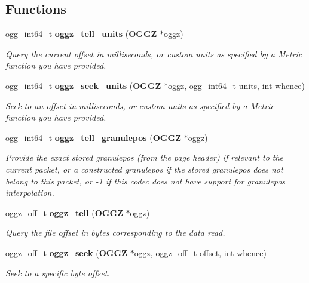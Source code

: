 \subsection*{Functions}
\begin{DoxyCompactItemize}
\item 
ogg\_\-int64\_\-t {\bf oggz\_\-tell\_\-units} ({\bf OGGZ} $\ast$oggz)
\begin{DoxyCompactList}\small\item\em Query the current offset in milliseconds, or custom units as specified by a Metric function you have provided. \item\end{DoxyCompactList}\item 
ogg\_\-int64\_\-t {\bf oggz\_\-seek\_\-units} ({\bf OGGZ} $\ast$oggz, ogg\_\-int64\_\-t units, int whence)
\begin{DoxyCompactList}\small\item\em Seek to an offset in milliseconds, or custom units as specified by a Metric function you have provided. \item\end{DoxyCompactList}\item 
ogg\_\-int64\_\-t {\bf oggz\_\-tell\_\-granulepos} ({\bf OGGZ} $\ast$oggz)
\begin{DoxyCompactList}\small\item\em Provide the exact stored granulepos (from the page header) if relevant to the current packet, or a constructed granulepos if the stored granulepos does not belong to this packet, or -\/1 if this codec does not have support for granulepos interpolation. \item\end{DoxyCompactList}\item 
oggz\_\-off\_\-t {\bf oggz\_\-tell} ({\bf OGGZ} $\ast$oggz)
\begin{DoxyCompactList}\small\item\em Query the file offset in bytes corresponding to the data read. \item\end{DoxyCompactList}\item 
oggz\_\-off\_\-t {\bf oggz\_\-seek} ({\bf OGGZ} $\ast$oggz, oggz\_\-off\_\-t offset, int whence)
\begin{DoxyCompactList}\small\item\em Seek to a specific byte offset. \item\end{DoxyCompactList}\item 

\end{DoxyCompactItemize}
